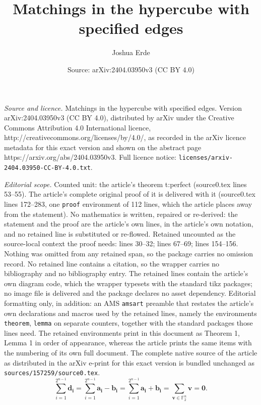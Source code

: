 \documentclass[10pt,a4paper]{amsart}
\title{Matchings in the hypercube with specified edges}
\author{Joshua Erde}
\date{Source: arXiv:2404.03950v3 (CC BY 4.0)}
\begin{document}
\maketitle

\noindent\emph{Source and licence.} Matchings in the hypercube with specified edges. Version arXiv:2404.03950v3 (CC BY 4.0), distributed by arXiv under the Creative Commons Attribution 4.0 International licence, http://creativecommons.org/licenses/by/4.0/, as recorded in the arXiv licence metadata for this exact version and shown on the abstract page https://arxiv.org/abs/2404.03950v3. Full licence notice: \texttt{licenses/arxiv-2404.03950-CC-BY-4.0.txt}.\par\smallskip

\noindent\textit{Editorial scope.} Counted unit: the article's theorem t:perfect (source0.tex lines 53--55). The article's complete original proof of it is delivered with it (source0.tex lines 172--283, one \texttt{proof} environment of 112 lines, which the article places away from the statement). No mathematics is written, repaired or re-derived: the statement and the proof are the article's own lines, in the article's own notation, and no retained line is substituted or re-flowed.  Retained uncounted as the source-local context the proof needs: lines 30--32; lines 67--69; lines 154--156.  Nothing was omitted from any retained span, so the package carries no omission record.  No retained line contains a citation, so the wrapper carries no bibliography and no bibliography entry.  The retained lines contain the article's own diagram code, which the wrapper typesets with the standard tikz packages; no image file is delivered and the package declares no asset dependency.  Editorial formatting only, in addition: an AMS \texttt{amsart} preamble that restates the article's own declarations and macros used by the retained lines, namely the environments \texttt{theorem}, \texttt{lemma} on separate counters, together with the standard packages those lines need.  The retained environments print in this document as Theorem 1, Lemma 1 in order of appearance, whereas the article prints the same items with the numbering of its own full document.  The complete native source of the article as distributed in the arXiv e-print for this exact version is bundled unchanged as \texttt{sources/157259/source0.tex}.
\begin{equation}\label{e:null}
\sum_{i=1}^{2^{n-1}} \bm{d_i} = \sum_{i=1}^{2^{n-1}}  \bm{a_i} - \bm{b_i} =   \sum_{i=1}^{2^{n-1}}  \bm{a_i} + \bm{b_i} = \sum_{\bm{v} \in \mathbb{F}_2^n} \bm{v} = \bm{0}.
\end{equation}
\end{document}

